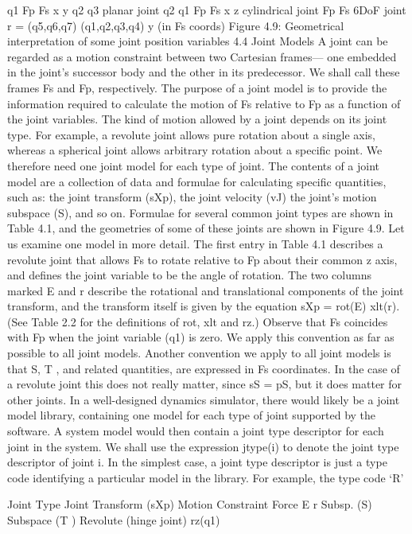 q1 Fp Fs x y q2 q3 planar joint q2 q1 Fp Fs x z cylindrical joint Fp Fs 6DoF joint r = (q5,q6,q7) (q1,q2,q3,q4) y (in Fs coords) Figure 4.9: Geometrical interpretation of some joint position variables 4.4 Joint Models A joint can be regarded as a motion constraint between two Cartesian frames— one embedded in the joint’s successor body and the other in its predecessor. We shall call these frames Fs and Fp, respectively. The purpose of a joint model is to provide the information required to calculate the motion of Fs relative to Fp as a function of the joint variables. The kind of motion allowed by a joint depends on its joint type. For example, a revolute joint allows pure rotation about a single axis, whereas a spherical joint allows arbitrary rotation about a specific point. We therefore need one joint model for each type of joint. The contents of a joint model are a collection of data and formulae for calculating specific quantities, such as: the joint transform (sXp), the joint velocity (vJ) the joint’s motion subspace (S), and so on. Formulae for several common joint types are shown in Table 4.1, and the geometries of some of these joints are shown in Figure 4.9. Let us examine one model in more detail. The first entry in Table 4.1 describes a revolute joint that allows Fs to rotate relative to Fp about their common z axis, and defines the joint variable to be the angle of rotation. The two columns marked E and r describe the rotational and translational components of the joint transform, and the transform itself is given by the equation sXp = rot(E) xlt(r). (See Table 2.2 for the definitions of rot, xlt and rz.) Observe that Fs coincides with Fp when the joint variable (q1) is zero. We apply this convention as far as possible to all joint models. Another convention we apply to all joint models is that S, T , and related quantities, are expressed in Fs coordinates. In the case of a revolute joint this does not really matter, since sS = pS, but it does matter for other joints. In a well-designed dynamics simulator, there would likely be a joint model library, containing one model for each type of joint supported by the software. A system model would then contain a joint type descriptor for each joint in the system. We shall use the expression jtype(i) to denote the joint type descriptor of joint i. In the simplest case, a joint type descriptor is just a type code identifying a particular model in the library. For example, the type code ‘R’

Joint Type Joint Transform (sXp) Motion Constraint Force E r Subsp. (S) Subspace (T ) Revolute (hinge joint) rz(q1)

